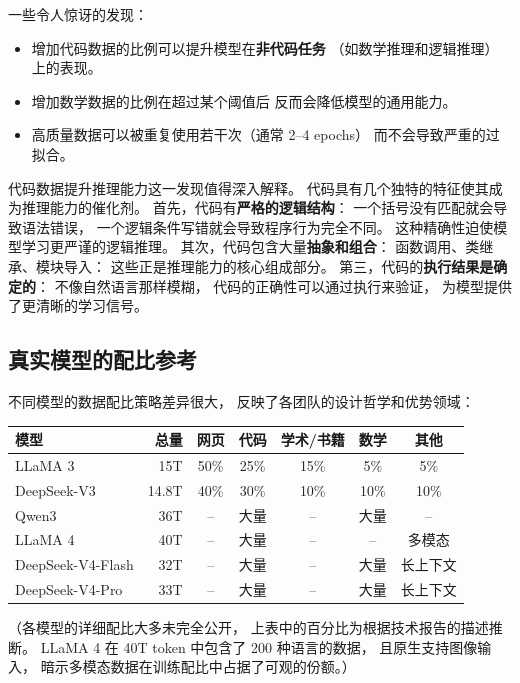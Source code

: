 一些令人惊讶的发现：
\begin{itemize}[noitemsep]
  \item 增加代码数据的比例可以提升模型在\textbf{非代码任务}
        （如数学推理和逻辑推理）上的表现。
  \item 增加数学数据的比例在超过某个阈值后
        反而会降低模型的通用能力。
  \item 高质量数据可以被重复使用若干次（通常 2--4 epochs）
        而不会导致严重的过拟合。
\end{itemize}

代码数据提升推理能力这一发现值得深入解释。
代码具有几个独特的特征使其成为推理能力的催化剂。
首先，代码有\textbf{严格的逻辑结构}：
一个括号没有匹配就会导致语法错误，
一个逻辑条件写错就会导致程序行为完全不同。
这种精确性迫使模型学习更严谨的逻辑推理。
其次，代码包含大量\textbf{抽象和组合}：
函数调用、类继承、模块导入：
这些正是推理能力的核心组成部分。
第三，代码的\textbf{执行结果是确定的}：
不像自然语言那样模糊，
代码的正确性可以通过执行来验证，
为模型提供了更清晰的学习信号。

\subsection{真实模型的配比参考}

不同模型的数据配比策略差异很大，
反映了各团队的设计哲学和优势领域：

\begin{center}\small
\renewcommand{\arraystretch}{1.3}
\begin{tabular}{lrccccc}
\toprule
\rowcolor{figLightGray}
\textbf{模型} & \textbf{总量} & \textbf{网页} & \textbf{代码} & \textbf{学术/书籍} & \textbf{数学} & \textbf{其他} \\
\midrule
LLaMA 3    & 15T  & 50\% & 25\% & 15\% & 5\%  & 5\%  \\
DeepSeek-V3 & 14.8T & 40\% & 30\% & 10\% & 10\% & 10\% \\
Qwen3      & 36T  & --   & 大量 & --   & 大量 & --   \\
LLaMA 4    & 40T  & --   & 大量 & --   & --   & 多模态 \\
DeepSeek-V4-Flash & 32T & --   & 大量 & --   & 大量 & 长上下文 \\
DeepSeek-V4-Pro   & 33T & --   & 大量 & --   & 大量 & 长上下文 \\
\bottomrule
\end{tabular}
\end{center}

（各模型的详细配比大多未完全公开，
上表中的百分比为根据技术报告的描述推断。
LLaMA 4 在 40T token 中包含了 200 种语言的数据，
且原生支持图像输入，
暗示多模态数据在训练配比中占据了可观的份额。）

